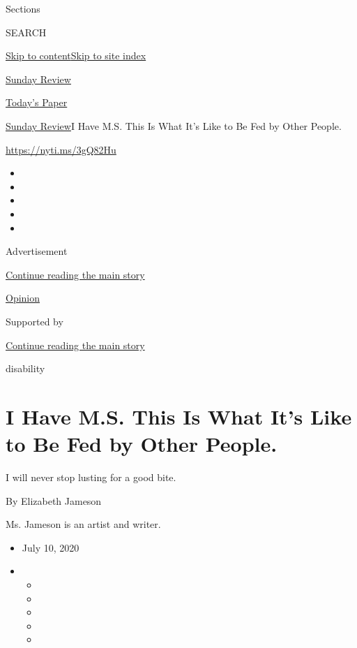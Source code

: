 Sections

SEARCH

\protect\hyperlink{site-content}{Skip to
content}\protect\hyperlink{site-index}{Skip to site index}

\href{https://www.nytimes.com/section/opinion/sunday}{Sunday Review}

\href{https://myaccount.nytimes.com/auth/login?response_type=cookie\&client_id=vi}{}

\href{https://www.nytimes.com/section/todayspaper}{Today's Paper}

\href{/section/opinion/sunday}{Sunday Review}\textbar{}I Have M.S. This
Is What It's Like to Be Fed by Other People.

\href{https://nyti.ms/3gQ82Hu}{https://nyti.ms/3gQ82Hu}

\begin{itemize}
\item
\item
\item
\item
\item
\end{itemize}

Advertisement

\protect\hyperlink{after-top}{Continue reading the main story}

\href{/section/opinion}{Opinion}

Supported by

\protect\hyperlink{after-sponsor}{Continue reading the main story}

disability

\hypertarget{i-have-ms-this-is-what-its-like-to-be-fed-by-other-people}{%
\section{I Have M.S. This Is What It's Like to Be Fed by Other
People.}\label{i-have-ms-this-is-what-its-like-to-be-fed-by-other-people}}

I will never stop lusting for a good bite.

By Elizabeth Jameson

Ms. Jameson is an artist and writer.

\begin{itemize}
\item
  July 10, 2020
\item
  \begin{itemize}
  \item
  \item
  \item
  \item
  \item
  \end{itemize}
\end{itemize}

